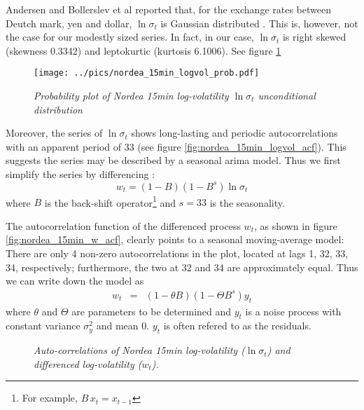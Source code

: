 Andersen and Bollerslev et al reported that, for the exchange
rates between Deutch mark, yen and dollar, $\ln \sigma_t$ is
Gaussian distributed \cite{Andersen03}. This is, however, not the case
for our modestly sized series. In fact, in our case, $\ln \sigma_t$ is
right skewed (skewness 0.3342) and leptokurtic (kurtosis 6.1006). See
figure \ref{fig:nordea_15min_logvol_prob}
\begin{figure}[htb!]
  \centering
  \texttt{[image: ../pics/nordea\_15min\_logvol\_prob.pdf]}
  \caption{\small \it Probability plot of Nordea 15min log-volatility
    $\ln\sigma_t$ unconditional distribution}
  \label{fig:nordea_15min_logvol_prob}
\end{figure}
Moreover, the series of $\ln\sigma_t$ shows long-lasting and
periodic autocorrelations with an apparent period of 33 (see figure
\ref{fig:nordea_15min_logvol_acf}). This suggests the series may be
described by a seasonal \gls{arima} model. Thus we first simplify the
series by differencing \cite{BoxJenkins94}:
\begin{equation}
  \label{eq:differenced_lv}
  w_t = (1-B)(1-B^s)\ln\sigma_t  
\end{equation}
where $B$ is the back-shift operator\footnote{For example, $B\,x_t =
  x_{t-1}$} and $s=33$ is the seasonality.

The autocorrelation function of the differenced process $w_t$, as
shown in figure \ref{fig:nordea_15min_w_acf}, clearly points to a seasonal
moving-average model: There are only 4 non-zero autocorrelations in
the plot, located at lags 1, 32, 33, 34, respectively; furthermore,
the two at 32 and 34 are approximately equal. Thus we can write down
the model as
\begin{eqnarray}
  w_t &=& (1 - \theta B)(1 - \Theta B^s) y_t \label{eq:nordea_w}
\end{eqnarray}
where $\theta$ and $\Theta$ are parameters to be determined and $y_t$
is a noise process with constant variance $\sigma_y^2$ and mean
0. $y_t$ is often refered to as the residuals.
\begin{figure}[htb!]
  \centering
  \caption{\small \it Auto-correlations of Nordea 15min log-volatility
    ($\ln\sigma_t$) and differenced log-volatility ($w_t$).}
  \label{fig:nordea1_15min_acf}
\end{figure}

